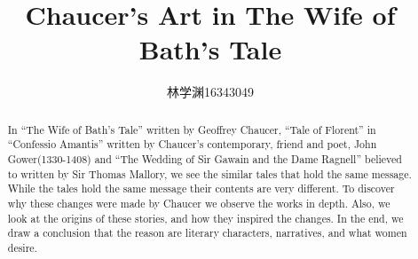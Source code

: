 \documentclass[sigconf]{acmart}
\begin{document}
\title{Chaucer's Art in The Wife of Bath’s Tale}

\author{林学渊16343049}

\begin{abstract}
In “The Wife of Bath’s Tale” written by Geoffrey Chaucer, “Tale of Florent” in “Confessio Amantis” written by Chaucer's contemporary, friend and poet, John Gower(1330-1408) and “The Wedding of Sir Gawain and the Dame Ragnell” believed to written by Sir Thomas Mallory, we see the similar tales that hold the same message. While the tales hold the same message their contents are very different. To discover why these changes were made by Chaucer we observe the works in depth. Also, we look at the origins of these stories, and how they inspired the changes. In the end, we draw a conclusion that the reason are literary characters, narratives, and what women desire.
\end{abstract}


\maketitle

%
%
%
%
%
%





\end{document}

